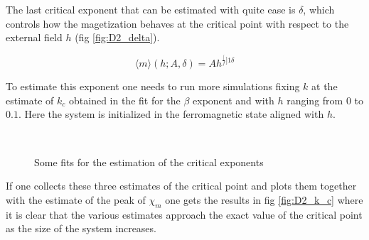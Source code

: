 \documentclass[a4paper, 11pt]{article}
\begin{document}

      The last critical exponent that can be estimated with quite ease is $\delta$, which controls how the magetization behaves at the critical point with respect to the external field $h$ (fig \ref{fig:D2_delta}).

      \begin{equation}
        \langle m \rangle (h;A,\delta) = Ah^{\frac[f]{1}{\delta}}
      \end{equation}

      To estimate this exponent one needs to run more simulations fixing $k$ at the estimate of $k_c$ obtained in the fit for the $\beta$ exponent and with $h$ ranging from $0$ to $0.1$. Here the system is initialized in the ferromagnetic state aligned with $h$.

      \begin{figure}[H]
        \centering
        \begin{subfigure}[Fit of the specific heat: estimation of $\alpha_1$, $\alpha_2$.]{
          \label{fig:D2_alpha}}
        \end{subfigure}
        \begin{subfigure}[Fit of the magnetization with respect to $k$ at $h = 0$: estimation of $\beta$.]{
          \label{fig:D2_beta}}
        \end{subfigure}\\
        \begin{subfigure}[Fit of the magnetic susceptibility: estimation of $\gamma_1$, $\gamma_2$.]{
          \label{fig:D2_gamma}}
        \end{subfigure}
        \begin{subfigure}[Fit of the magnetization with respect to $h$ at $k = k_c$: estimation of $\delta$.]{
          \label{fig:D2_delta}}
        \end{subfigure}
        \caption{Some fits for the estimation of the critical exponents}
      \end{figure}

      If one collects these three estimates of the critical point and plots them together with the estimate of the peak of $\chi_m$ one gets the results in fig \ref{fig:D2_k_c} where it is clear that the various estimates approach the exact value of the critical point as the size of the system increases.
\end{document}
